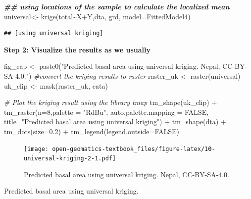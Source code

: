 \documentclass[
]{book}
\newenvironment{Shaded}{\begin{snugshade}}{\end{snugshade}}
\newcommand{\AttributeTok}[1]{\textcolor[rgb]{0.77,0.63,0.00}{#1}}
\newcommand{\CommentTok}[1]{\textcolor[rgb]{0.56,0.35,0.01}{\textit{#1}}}
\newcommand{\ConstantTok}[1]{\textcolor[rgb]{0.00,0.00,0.00}{#1}}
\newcommand{\DecValTok}[1]{\textcolor[rgb]{0.00,0.00,0.81}{#1}}
\newcommand{\DocumentationTok}[1]{\textcolor[rgb]{0.56,0.35,0.01}{\textbf{\textit{#1}}}}
\newcommand{\FloatTok}[1]{\textcolor[rgb]{0.00,0.00,0.81}{#1}}
\newcommand{\FunctionTok}[1]{\textcolor[rgb]{0.00,0.00,0.00}{#1}}
\newcommand{\NormalTok}[1]{#1}
\newcommand{\OtherTok}[1]{\textcolor[rgb]{0.56,0.35,0.01}{#1}}
\newcommand{\SpecialCharTok}[1]{\textcolor[rgb]{0.00,0.00,0.00}{#1}}
\newcommand{\StringTok}[1]{\textcolor[rgb]{0.31,0.60,0.02}{#1}}
\begin{document}
\begin{Shaded}
\begin{Highlighting}[]
\DocumentationTok{\#\# using locations of the sample to calculate the localized mean}
\NormalTok{universal}\OtherTok{\textless{}{-}} \FunctionTok{krige}\NormalTok{(total}\SpecialCharTok{\textasciitilde{}}\NormalTok{X}\SpecialCharTok{+}\NormalTok{Y,dta, grd, }\AttributeTok{model=}\NormalTok{FittedModel4)}
\end{Highlighting}
\end{Shaded}

\begin{verbatim}
## [using universal kriging]
\end{verbatim}

\textbf{Step 2: Visualize the results as we usually}

\begin{Shaded}
\begin{Highlighting}[]
\NormalTok{fig\_cap }\OtherTok{\textless{}{-}} \FunctionTok{paste0}\NormalTok{(}\StringTok{"Predicted basal area using universal kriging. Nepal, CC{-}BY{-}SA{-}4.0."}\NormalTok{)}
\CommentTok{\#convert the kriging results to raster}
\NormalTok{raster\_uk      }\OtherTok{\textless{}{-}} \FunctionTok{raster}\NormalTok{(universal)}
\NormalTok{uk\_clip    }\OtherTok{\textless{}{-}} \FunctionTok{mask}\NormalTok{(raster\_uk, cata)}

\CommentTok{\# Plot the kriging result using the library tmap}
\FunctionTok{tm\_shape}\NormalTok{(uk\_clip) }\SpecialCharTok{+} 
  \FunctionTok{tm\_raster}\NormalTok{(}\AttributeTok{n=}\DecValTok{8}\NormalTok{,}\AttributeTok{palette =} \StringTok{"RdBu"}\NormalTok{, }\AttributeTok{auto.palette.mapping =} \ConstantTok{FALSE}\NormalTok{,}
            \AttributeTok{title=}\StringTok{"Predicted basal area using universal kriging"}\NormalTok{) }\SpecialCharTok{+} 
  \FunctionTok{tm\_shape}\NormalTok{(dta) }\SpecialCharTok{+} \FunctionTok{tm\_dots}\NormalTok{(}\AttributeTok{size=}\FloatTok{0.2}\NormalTok{) }\SpecialCharTok{+}
  \FunctionTok{tm\_legend}\NormalTok{(}\AttributeTok{legend.outside=}\ConstantTok{FALSE}\NormalTok{)}
\end{Highlighting}
\end{Shaded}

\begin{figure}
\centering
\texttt{[image: open-geomatics-textbook\_files/figure-latex/10-universal-kriging-2-1.pdf]}
\caption{\label{fig:10-universal-kriging-2}Predicted basal area using universal kriging. Nepal, CC-BY-SA-4.0.}
\end{figure}

Predicted basal area using universal kriging.
\end{document}
